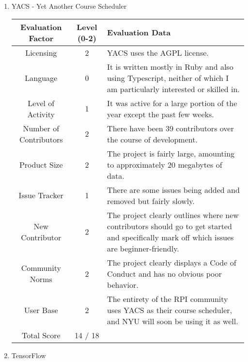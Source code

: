 \documentclass[12pt]{article}
\begin{document}
\begin{enumerate}
		\item YACS - Yet Another Course Scheduler
		
		\hspace*{-1cm}
		\noindent\begin{tabular}{ | c | c | L | } 
			\hline
			Evaluation Factor & Level (0-2) & Evaluation Data \\\hline
			Licensing & 2& YACS uses the AGPL license. \\\hline
			Language & 0 & It is written mostly in Ruby and also using Typescript, neither of which I am particularly interested or skilled in. \\\hline
			Level of Activity & 1 & It was active for a large portion of the year except the past few weeks. \\\hline		
			Number of Contributors & 2 & There have been 39 contributors over the course of development. \\\hline
			Product Size & 2 & The project is fairly large, amounting to approximately 20 megabytes of data. \\\hline
			Issue Tracker & 1 & There are some issues being added and removed but fairly slowly. \\\hline
			New Contributor & 2 & The project clearly outlines where new contributors should go to get started and specifically mark off which issues are beginner-friendly. \\\hline
			Community Norms & 2 & The project clearly displays a Code of Conduct and has no obvious poor behavior. \\\hline
			User Base & 2 & The entirety of the RPI community uses YACS as their course scheduler, and NYU will soon be using it as well. \\\hline
			Total Score & 14 / 18 & \\\hline
		\end{tabular}
	
		\item TensorFlow
		

\end{enumerate}
\end{document}
